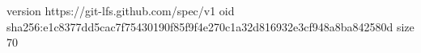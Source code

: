 version https://git-lfs.github.com/spec/v1
oid sha256:e1c8377dd5cac7f75430190f85f9f4e270c1a32d816932e3cf948a8ba842580d
size 70
